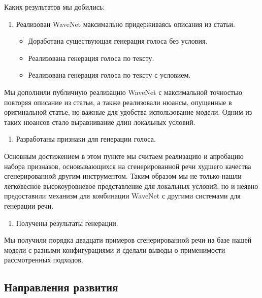 \documentclass[../diploma.tex]{subfiles}
\begin{document}
Каких результатов мы добились:

\begin{enumerate}
    \item Реализован WaveNet максимально придерживаясь описания из статьи.
    \begin{itemize}
        \item Доработана существующая генерация голоса без условия.
        \item Реализована генерация голоса по тексту.
        \item Реализована генерация голоса по тексту с условием.
    \end{itemize}    
\end{enumerate}

Мы дополнили публичную реализацию WaveNet с максимальной точностью повторяя описание из статьи, а также реализовали нюансы, опущенные в оригинальной статье, но важные для удобства использование модели. Одним из таких нюансов стало выравнивание длин локальных условий.

\begin{enumerate}[resume]
    \item Разработаны признаки для генерации голоса.
\end{enumerate}

Основным достижением в этом пункте мы считаем реализацию и апробацию набора признаков, основывающихся на сгенерированной речи худшего качества сгенерированной другим инструментом. Таким образом мы не только нашли легковесное высокоуровневое представление для локальных условий, но и неявно предоставили механизм для комбинации WaveNet с другими системами для генерации речи. 

\begin{enumerate}[resume]
    \item Получены результаты генерации.
\end{enumerate}

Мы получили порядка двадцати примеров сгенерированной речи на базе нашей модели с разными конфигурациями и сделали выводы о применимости рассмотренных подходов.

\subsection{Направления развития}
\end{document}
